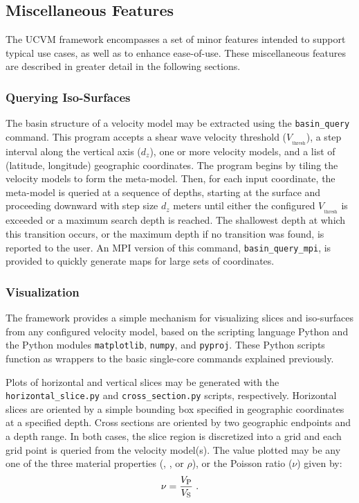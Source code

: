 
\subsection{Miscellaneous Features}

The UCVM framework encompasses a set of minor features intended to support typical use cases, as well as to enhance ease-of-use. These miscellaneous features are described in greater detail in the following sections.

\subsubsection{Querying \vs{} Iso-Surfaces}

The basin structure of a velocity model may be extracted using the \texttt{basin\_query} command. This program accepts a shear wave velocity threshold ($V_{_{\mathrm{thresh}}}$), a step interval along the vertical axis ($d_z$), one or more velocity models, and a list of (latitude, longitude) geographic coordinates. The program begins by tiling the velocity models to form the meta-model. Then, for each input coordinate, the meta-model is queried at a sequence of depths, starting at the surface and proceeding downward with step size $d_z$ meters until either the configured $V_{_{\mathrm{thresh}}}$ is exceeded or a maximum search depth is reached. The shallowest depth at which this transition occurs, or the maximum depth if no transition was found, is reported to the user. An MPI version of this command, \texttt{basin\_query\_mpi}, is provided to quickly generate maps for large sets of coordinates.

\subsubsection{Visualization}

The framework provides a simple mechanism for visualizing slices and iso-surfaces from any configured velocity model, based on the scripting language Python and the Python modules \texttt{matplotlib}, \texttt{numpy}, and \texttt{pyproj}. These Python scripts function as wrappers to the basic single-core commands explained previously.

Plots of horizontal and vertical slices may be generated with the \texttt{horizontal\_slice.py} and \texttt{cross\_section.py} scripts, respectively. Horizontal slices are oriented by a simple bounding box specified in geographic coordinates at a specified depth. Cross sections are oriented by two geographic endpoints and a depth range. In both cases, the slice region is discretized into a grid and each grid point is queried from the velocity model(s). The value plotted may be any one of the three material properties (\vp{}, \vs{}, or $\rho$), or the Poisson ratio ($\nu$) given by:
%
\begin{equation}
	\nu = \frac{ V_{\mathrm{P}} }{ V_{\mathrm{S}} }
	\hspace{0.3em}.
\end{equation}

